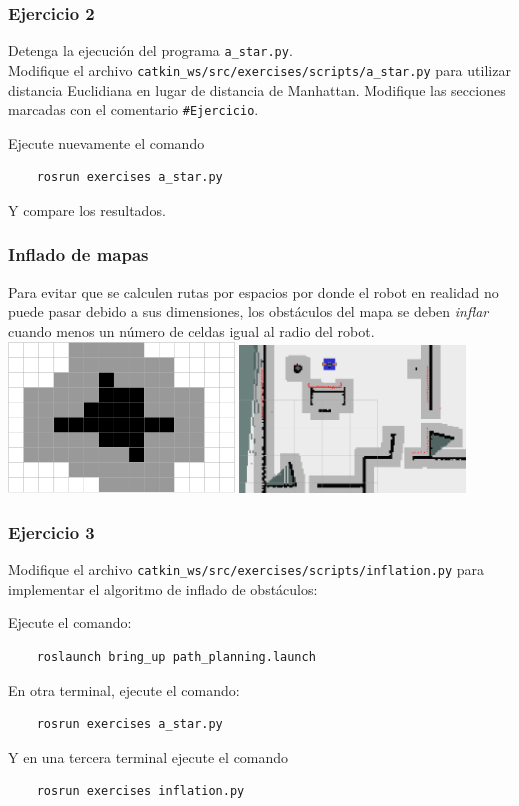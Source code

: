 \begin{frame}[containsverbatim]\frametitle{Ejercicio 2}
  Detenga la ejecución del programa \texttt{a\_star.py}. \\
    Modifique el archivo \texttt{catkin\_ws/src/exercises/scripts/a\_star.py} para utilizar distancia Euclidiana en lugar de distancia de Manhattan. Modifique las secciones marcadas con el comentario \texttt{\#Ejercicio}. 
    
    
    Ejecute nuevamente el comando
    \begin{lstlisting}
    rosrun exercises a_star.py
    \end{lstlisting}
    Y compare los resultados. 
\end{frame}

\begin{frame}\frametitle{Inflado de mapas}
  Para evitar que se calculen rutas por espacios por donde el robot en realidad no puede pasar debido a sus dimensiones, los obstáculos del mapa se deben \textit{inflar} cuando menos un número de celdas igual al radio del robot.\\
  \includegraphics[width=0.45\textwidth]{Figures/Inflation.pdf}
  \includegraphics[width=0.45\textwidth]{Figures/Inflation.png}
\end{frame}

\begin{frame}[containsverbatim]\frametitle{Ejercicio 3}
  Modifique el archivo \texttt{catkin\_ws/src/exercises/scripts/inflation.py} para implementar el algoritmo de inflado de obstáculos:
  
  Ejecute el comando:
  \begin{lstlisting}
    roslaunch bring_up path_planning.launch
  \end{lstlisting}
  En otra terminal, ejecute el comando:
  \begin{lstlisting}
    rosrun exercises a_star.py
  \end{lstlisting}
  Y en una tercera terminal ejecute el comando
  \begin{lstlisting}
    rosrun exercises inflation.py
  \end{lstlisting}
\end{frame}

